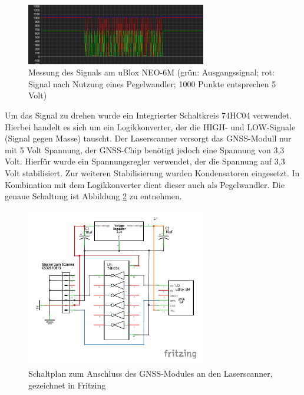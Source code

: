 \documentclass[a4paper,12pt,bibliography=totoc, listof=totoc,titlepage]{scrreprt}
\begin{document}
\begin{figure}[ht!]
 \centering
 \includegraphics[width=0.7\textwidth]{img/oszi.png}
 \caption{Messung des Signals am uBlox NEO-6M (grün: Ausgangssignal; rot: Signal nach Nutzung eines Pegelwandler; 1000 Punkte entsprechen 5 Volt)}
 \label{abb:oszi}
\end{figure}

Um das Signal zu drehen wurde ein Integrierter Schaltkreis 74HC04 verwendet. Hierbei handelt es sich um ein Logikkonverter, der die HIGH- und LOW-Signale (Signal gegen Masse) tauscht. Der Laserscanner versorgt das GNSS-Modull nur mit 5 Volt Spannung, der GNSS-Chip benötigt jedoch eine Spannung von 3,3 Volt. Hierfür wurde ein Spannungsregler verwendet, der die Spannung auf 3,3 Volt stabilisiert. Zur weiteren Stabilisierung wurden Kondensatoren eingesetzt. In Kombination mit dem Logikkonverter dient dieser auch als Pegelwandler. Die genaue Schaltung ist Abbildung \ref{abb:schaltplan} zu entnehmen.

\begin{figure}[ht!]
 \centering
 \includegraphics[width=0.7\textwidth]{img/GPS_Schaltung.pdf}
 \caption{Schaltplan zum Anschluss des GNSS-Modules an den Laserscanner, gezeichnet in Fritzing}
 \label{abb:schaltplan}
\end{figure}
\end{document}
